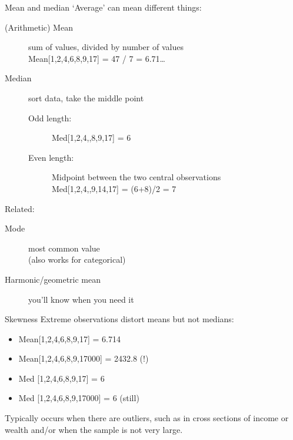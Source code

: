 \documentclass[aspectratio=169,usenames,dvipsnames]{beamer}
\begin{document}
\begin{frame}{Mean and median}
    `Average' can mean different things:
    \begin{description}
        \item[(Arithmetic) Mean] sum of values, divided by number of values \\
                Mean[1,2,4,6,8,9,17] = 47 / 7 = 6.71\dots

        \item[Median] sort data, take the middle point

            \begin{description}
            \item[Odd length:]
                Med[1,2,4,,8,9,17] = 6

            \item[Even length:]
                Midpoint between the two central observations \\
                Med[1,2,4,,9,14,17] = (6+8)/2 = 7
            \end{description}
    \end{description}
    Related:
    \begin{description}
        \item[Mode] most common value \\
            (also works for categorical)
        \item[Harmonic/geometric mean] you'll know when you need it
    \end{description}
\end{frame}

\begin{frame}{Skewness}
Extreme observations distort means but not medians:
\begin{itemize}
\item Mean[1,2,4,6,8,9,17] = 6.714
\item Mean[1,2,4,6,8,9,17000] = 2432.8 (!)
\item Med [1,2,4,6,8,9,17] = 6
\item Med [1,2,4,6,8,9,17000] = 6 (still)
\end{itemize}
Typically occurs when there are outliers,
such as in cross sections of income or wealth
and/or when the sample is not very large.
\end{frame}
\end{document}
